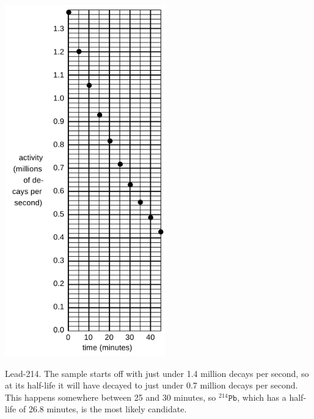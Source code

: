 \documentclass[addpoints,12pt]{exam}
\begin{document}
\begin{questions}
\includegraphics[height=6in]{../images/decay.png}
\begin{TheSolution}
Lead-214. The sample starts off with just under 1.4 million decays per second, so at its half-life it will have decayed to just under 0.7 million decays per second. This happens somewhere between 25 and 30 minutes, so $^{214}\texttt{Pb}$, which has a half-life of 26.8 minutes, is the most likely candidate.
\end{TheSolution}


\clearpage


\end{questions}
\end{document}
